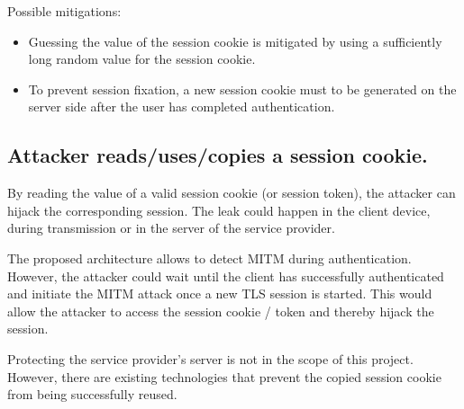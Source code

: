Possible mitigations:
\begin{itemize}
\item Guessing the value of the session cookie is mitigated by using a sufficiently long random value for the session cookie. 
\item To prevent session fixation, a new session cookie must to be generated on the server side after the user has completed authentication.
\end{itemize}


\subsection{Attacker reads/uses/copies a session cookie.}
\label{threat:read-cookie}
By reading the value of a valid session cookie (or session token), the attacker can hijack the corresponding session. The leak could happen in the client device, during transmission or in the server of the service provider.

The proposed architecture allows to detect MITM during authentication. However, the attacker could wait until the client has successfully authenticated and initiate the MITM attack once a new TLS session is started. This would allow the attacker to access the session cookie / token and thereby hijack the session. 

Protecting the service provider's server is not in the scope of this project. However, there are existing technologies that prevent the copied session cookie from being successfully reused. 

